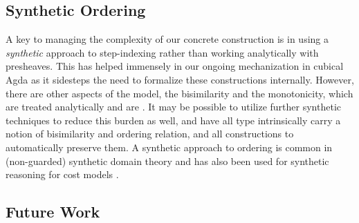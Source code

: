 \subsection{Synthetic Ordering}

A key to managing the complexity of our concrete construction is in
using a \emph{synthetic} approach to step-indexing rather than working
analytically with presheaves. This has helped immensely in our ongoing
mechanization in cubical Agda as it sidesteps the need to formalize
these constructions internally. 
%
However, there are other aspects of the model, the bisimilarity and
the monotonicity, which are treated analytically and are .
%
It may be possible to utilize further synthetic techniques to reduce
this burden as well, and have all type intrinsically carry a notion of
bisimilarity and ordering relation, and all constructions to
automatically preserve them.
%
A synthetic approach to ordering is common in (non-guarded) synthetic
domain theory and has also been used for synthetic reasoning for cost
models \cite{synthetic-domain-theory,decalf}.

\subsection{Future Work}

